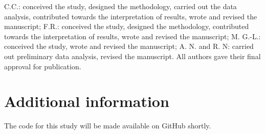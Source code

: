 \documentclass[fleqn,10pt]{wlscirep}
\begin{document}
C.C.: conceived the study, designed the methodology, carried out the data analysis, contributed towards the interpretation of results, wrote and revised the manuscript; F.R.: conceived the study, designed the methodology, contributed towards the interpretation of results, wrote and revised the manuscript; M. G.-L.: conceived the study, wrote and revised the manuscript; A. N. and R. N: carried out preliminary data analysis, revised the manuscript. All authors gave their final approval for publication.

\section*{Additional information}

The code for this study will be made available on GitHub shortly.

\end{document}
